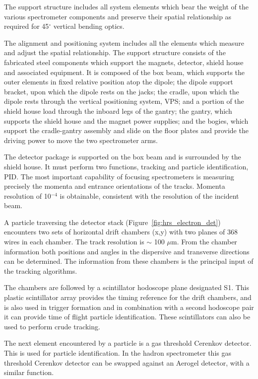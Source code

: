 The support structure includes all system elements which bear the weight 
of the various spectrometer components and preserve their spatial 
relationship as required for 45$^{\circ}$ vertical bending optics.

The alignment and positioning system includes all the elements which 
measure and adjust the spatial relationship.  The support structure 
consists of the fabricated steel components which support the magnets, 
detector, shield house and associated equipment.  It is composed of the 
box beam, which supports the outer elements in fixed relative position 
atop the dipole; the dipole support bracket, upon which the dipole rests on 
the jacks; the cradle, upon which the dipole rests through the vertical 
positioning system, VPS; and a portion of the shield house load through 
the inboard legs of the gantry; the gantry, which supports the shield 
house and the magnet power supplies; and the bogies, which support the 
cradle-gantry assembly and slide on the floor plates and provide the 
driving power to move the two spectrometer arms.

The detector package is supported on the box beam and is surrounded by 
the shield house.  It must perform two functions, tracking and particle 
identification, PID.  The most important capability of focusing 
spectrometers is measuring precisely the momenta and entrance 
orientations of the tracks.  Momenta resolution of 10$^{-4}$ is 
obtainable, consistent with the resolution of the incident beam.

A particle traversing the detector stack 
(Figure~\ref{fig:hrs_electron_det}) encounters two sets of horizontal 
drift chambers (x,y) with two planes of 368
wires in each chamber. The track resolution is $\sim$ 100 $\mu$m.  
From the chamber information both 
positions and angles in the dispersive and transverse directions can be 
determined.  The information from these chambers is the principal input 
of the tracking algorithms.

The chambers are followed by a scintillator hodoscope plane designated S1. 
This plastic scintillator array provides the timing reference for 
the drift chambers, and is also used in trigger formation and in combination 
with a second hodoscope pair it can provide time of flight particle 
identification.  These scintillators can also be used to perform crude 
tracking.

The next element encountered by a particle is a gas threshold Cerenkov 
detector.  This is used for particle identification.  In the hadron 
spectrometer this gas threshold Cerenkov detector can be swapped 
against an Aerogel detector, with a similar function.

